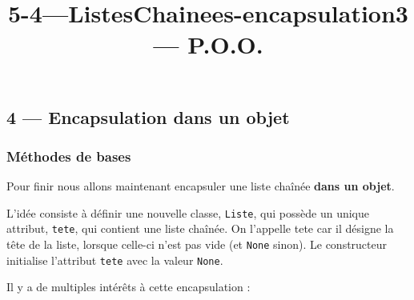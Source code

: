 \documentclass[a4paper,17pt]{extarticle}
\title{5-4---ListesChainees-encapsulation}
\begin{document}
    
    \title{3 --- P.O.O.}

    
    

    
    \hypertarget{encapsulation-dans-un-objet}{%
\subsection{4 --- Encapsulation dans un
objet}\label{encapsulation-dans-un-objet}}

    \hypertarget{muxe9thodes-de-bases}{%
\subsubsection{Méthodes de bases}\label{muxe9thodes-de-bases}}
\begin{retenir}
    Pour finir nous allons maintenant encapsuler une liste chaînée
\textbf{dans un objet}.

L'idée consiste à définir une nouvelle classe, \texttt{Liste}, qui
possède un unique attribut, \texttt{tete}, qui contient une liste
chaînée. On l'appelle tete car il désigne la tête de la liste, lorsque
celle-ci n'est pas vide (et \texttt{None} sinon). Le constructeur
initialise l'attribut \texttt{tete} avec la valeur \texttt{None}.

        \end{retenir}
    Il y a de multiples intérêts à cette encapsulation :
\end{document}
